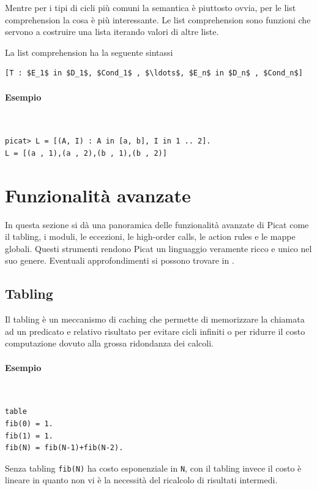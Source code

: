 \documentclass[12pt,a4paper,openright]{book} %
\begin{document}
Mentre per i tipi di cicli più comuni la semantica è piuttosto ovvia,
per le list comprehension la cosa è più interessante. Le list
comprehension sono funzioni che servono a costruire una lista iterando
valori di altre liste.

La list comprehension ha la seguente sintassi
\begin{lstlisting}
[T : $E_1$ in $D_1$, $Cond_1$ , $\ldots$, $E_n$ in $D_n$ , $Cond_n$]
\end{lstlisting}

\paragraph{Esempio}\
\begin{lstlisting}
picat> L = [(A, I) : A in [a, b], I in 1 .. 2].
L = [(a , 1),(a , 2),(b , 1),(b , 2)]
\end{lstlisting}

\section{Funzionalità avanzate}
\label{sec:picat_advanced}

In questa sezione si dà una panoramica delle funzionalità avanzate di
Picat come il tabling, i moduli, le eccezioni, le high-order calls, le
action rules e le mappe globali. Questi strumenti rendono Picat un
linguaggio veramente ricco e unico nel suo genere. Eventuali
approfondimenti si possono trovare in \cite{PicatGuide}.

\subsection{Tabling}
\label{subsec:picat_advanced_tabling}

Il tabling è un meccanismo di caching che permette di memorizzare la
chiamata ad un predicato e relativo risultato per evitare cicli
infiniti o per ridurre il costo computazione dovuto alla grossa
ridondanza dei calcoli.

\paragraph{Esempio}\
\begin{lstlisting}
table
fib(0) = 1.
fib(1) = 1.
fib(N) = fib(N-1)+fib(N-2).
\end{lstlisting}
Senza tabling \verb|fib(N)| ha costo esponenziale in \verb|N|, con il
tabling invece il costo è lineare in quanto non vi è la necessità del
ricalcolo di risultati intermedi.
\end{document}
